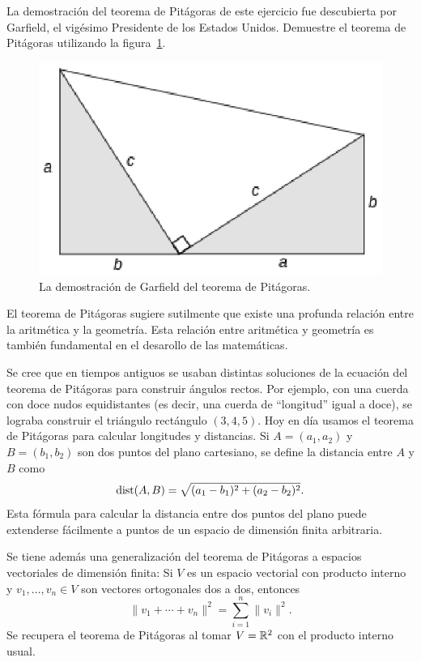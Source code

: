 \begin{exercise}
	La demostración del teorema de Pitágoras de este ejercicio fue descubierta
	por Garfield, el vigésimo Presidente de los Estados Unidos.  Demuestre el
	teorema de Pitágoras utilizando la figura~\ref{fig:garfield}.
	\begin{figure}[h]
		\centering
		\includegraphics[scale=0.5]{images/garfield}
		\caption{La demostración de Garfield del teorema de Pitágoras.}
		\label{fig:garfield}
	\end{figure}
\end{exercise}


El teorema de Pitágoras sugiere sutilmente que existe una profunda relación
entre la aritmética y la geometría. Esta relación entre aritmética y geometría
es también fundamental en el desarollo de las matemáticas. 

Se cree que en tiempos antiguos se usaban distintas soluciones de la ecuación
del teorema de Pitágoras para construir ángulos rectos.  Por ejemplo, con una
cuerda con doce nudos equidistantes (es decir, una cuerda de ``longitud'' igual
a doce), se lograba construir el triángulo rectángulo $(3,4,5)$.  Hoy en día
usamos el teorema de Pitágoras para calcular longitudes y distancias.  Si
$A=(a_1,a_2)$ y $B=(b_1,b_2)$ son dos puntos del plano cartesiano, se define la
distancia entre $A$ y $B$ como 
\[
	\mathrm{dist}(A,B)=\sqrt{(a_1-b_1)^2+(a_2-b_2)^2}.
\]
Esta fórmula para calcular la distancia entre dos puntos del plano puede
extenderse fácilmente a puntos de un espacio de dimensión finita arbitraria. 

Se tiene
además una generalización del teorema de Pitágoras a espacios vectoriales de
dimensión finita: Si $V$ es un espacio vectorial con producto interno y
$v_1,\dots,v_n\in V$ son vectores ortogonales dos a dos, entonces 
\[
	\|v_1+\cdots+v_n\|^2=\sum_{i=1}^n \|v_i\|^2.
\]
Se recupera el teorema de Pitágoras al tomar $V=\mathbb{R}^2$ con el producto interno
usual.

